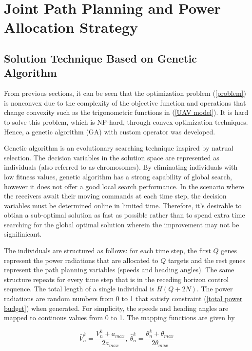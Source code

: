 \documentclass[12pt,journal,draftclsnofoot,onecolumn]{IEEEtran}
\begin{document}
\section{Joint Path Planning and Power Allocation Strategy}


\subsection{Solution Technique Based on Genetic Algorithm}
From previous sections, it can be seen that the optimization problem (\ref{problem}) is nonconvex due to the complexity of the objective function and operations that change convexity such as the trigonometric functions in (\ref{UAV model}). It is hard to solve this problem, which is NP-hard, through convex optimization techniques. Hence, a genetic algorithm (GA) with custom operator was developed.  

Genetic algorithm is an evolutionary searching technique inspired by natrual selection.%
 The decision variables in the solution space are represented as individuals (also referred to as chromosomes). By eliminating individuals with low fitness values, genetic algorithm has a strong capability of global search, however it does not offer a good local search performance. In the scenario where the receivers await their moving commands at each time step, the decision variables must be determined online in limited time. Therefore, it's desirable to obtian a sub-optimal solution as fast as possible rather than to spend extra time searching for the global optimal solution wherein the improvement may not be signifinicant.

The individuals are structured as follows: for each time step, the first $Q$ genes represent the power radiations that are allocated to $Q$ targets and the rest genes represent the path planning variables (speeds and heading angles). The same structure repeats for every time step that is in the receding horizon control sequence. The total length of a single individual is $H(Q+2N)$. The power radiations are random numbers from 0 to 1 that satisfy constraint (\ref{total power budget}) when generated. For simplicity, the speeds and heading angles are mapped to continous values from 0 to 1. The mapping functions are given by 

\begin{equation}
	\bar{V}_n^k=\frac{V_n^k+a_{max}}{2a_{max}}, \  \bar{\theta}_n^k=\frac{\theta_n^k+\theta_{max}}{2\theta_{max}} 
\end{equation}
\end{document}

